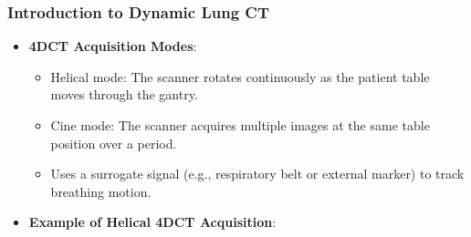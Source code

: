 \begin{frame}[t, fragile]

  \frametitle{Introduction to Dynamic Lung CT}

  \begin{itemize}
    \item<1-> \textbf{4DCT Acquisition Modes}:
          \begin{itemize}
            \item Helical mode: The scanner rotates continuously as the patient table moves through the gantry.
            \item Cine mode: The scanner acquires multiple images at the same table position over a period.
            \item Uses a surrogate signal (e.g., respiratory belt or external marker) to track breathing motion.
          \end{itemize}
    \item<2-> \textbf{Example of Helical 4DCT Acquisition}:

  \end{itemize}


\end{frame}



